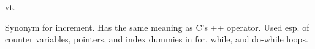  vt.

Synonym for increment. Has the same meaning as C's ++ operator. Used esp. of
counter variables, pointers, and index dummies in for, while, and do-while
loops.

